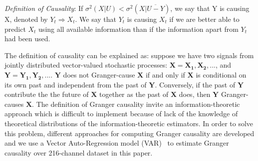 \emph{Definition of Causality}: If $\sigma^2(X|U)<\sigma^2(X|\overline{U-Y})$, we say that Y is causing X, denoted by $Y_t \Rightarrow X_t$. We say that $Y_t$ is causing $X_t$ if we are better able to predict $X_t$ using all available information than if the information apart from $Y_t$ had been used.

The definition of causality can be explained as: suppose we have two signals from jointly distributed vector-valued stochastic processes: $\mathbf{X}=\mathbf{X_1}, \mathbf{X_2},...$, and $\mathbf{Y}=\mathbf{Y_1}, \mathbf{Y_2},...$. $\mathbf{Y}$ does not Granger-cause $\mathbf{X}$ if and only if $\mathbf{X}$ is conditional on its own past and independent from the past of $\mathbf{Y}$. Conversely, if the past of $\mathbf{Y}$ contribute the the future of $\mathbf{X}$ together as the past of $\mathbf{X}$ does, then $\mathbf{Y}$ Granger-causes $\mathbf{X}$. The definition of Granger causality invite an information-theoretic approach which is difficult to implement because of lack of the knowledge of theoretical distributions of the information-theoretic estimators. In order to solve this problem, different approaches for computing Granger causality are developed and we use a Vector Auto-Regression model (VAR)~\cite{barnett2014mvgc} to estimate Granger causality over 216-channel dataset in this paper.


